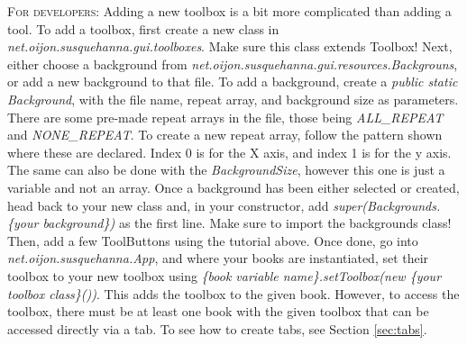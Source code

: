 \documentclass{report}
\begin{document}
	\par
	\begin{tcolorbox}[width=1\textwidth]
		\textsc{For developers:} Adding a new toolbox is a bit more complicated than adding a tool. To add a toolbox, first create a new class in \emph{net.oijon.susquehanna.gui.toolboxes}. Make sure this class extends Toolbox! Next, either choose a background from \emph{net.oijon.susquehanna.gui.resources.Backgrouns}, or add a new background to that file. To add a background, create a \emph{public static Background}, with the file name, repeat array, and background size as parameters. There are some pre-made repeat arrays in the file, those being \emph{ALL\_REPEAT} and \emph{NONE\_REPEAT}. To create a new repeat array, follow the pattern shown where these are declared. Index 0 is for the X axis, and index 1 is for the y axis. The same can also be done with the \emph{BackgroundSize}, however this one is just a variable and not an array. Once a background has been either selected or created, head back to your new class and, in your constructor, add \emph{super(Backgrounds.\{your background\})} as the first line. Make sure to import the backgrounds class! Then, add a few ToolButtons using the tutorial above. Once done, go into \emph{net.oijon.susquehanna.App}, and where your books are instantiated, set their toolbox to your new toolbox using \emph{\{book variable name\}.setToolbox(new \{your toolbox class\}())}. This adds the toolbox to the given book. However, to access the toolbox, there must be at least one book with the given toolbox that can be accessed directly via a tab. To see how to create tabs, see Section \ref{sec:tabs}.
	\end{tcolorbox}
\end{document}
